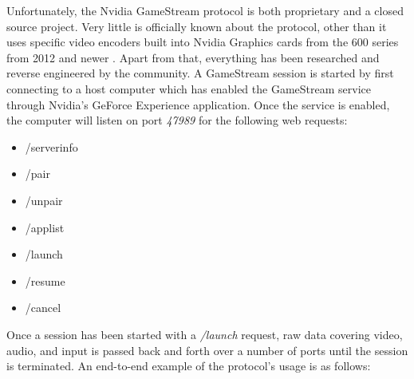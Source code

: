 Unfortunately, the Nvidia GameStream protocol is both proprietary and a closed source project.
Very little is officially known about the protocol, other than it uses specific video encoders built into Nvidia Graphics cards from the 600 series from 2012 and newer \cite{gamestream_userguide}.
Apart from that, everything has been researched and reverse engineered by the community.
A GameStream session is started by first connecting to a host computer which has enabled the GameStream service through Nvidia's GeForce Experience application.
Once the service is enabled, the computer will listen on port \emph{47989} for the following web requests:
\begin{itemize}
  \item /serverinfo
  \item /pair
  \item /unpair
  \item /applist
  \item /launch
  \item /resume
  \item /cancel
\end{itemize}
Once a session has been started with a \emph{/launch} request, raw data covering video, audio, and input is passed back and forth over a number of ports until the session is terminated.
An end-to-end example of the protocol's usage is as follows:

